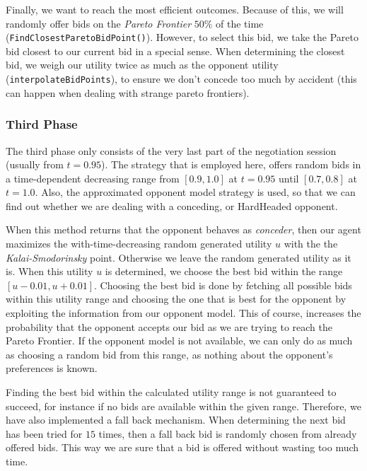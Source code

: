 Finally, we want to reach the most efficient outcomes. Because of this,
we will randomly offer bids on the \emph{Pareto Frontier} $50\%$ of the time (\verb-FindClosestParetoBidPoint()-).
However, to select this bid, we take the Pareto bid closest to our current bid in a special sense.
When determining the closest bid, we weigh our utility twice as much
as the opponent utility (\verb-interpolateBidPoints-), to ensure we don't concede too much by accident 
(this can happen when dealing with strange pareto frontiers).

\subsubsection{Third Phase}

The third phase only consists of the very last part of the negotiation session (usually from $t = 0.95$). The strategy that is employed here, offers random bids in a time-dependent decreasing range from $[0.9, 1.0]$ at $t = 0.95$ until $[0.7, 0.8]$ at $t = 1.0$. Also, the approximated opponent model strategy is used, so that we can find out whether we are dealing with a conceding, or HardHeaded opponent. 

When this method returns that the opponent behaves as \emph{conceder}, then our agent maximizes the with-time-decreasing random generated utility $u$ with the the \emph{Kalai-Smodorinsky} point. Otherwise we leave the random generated utility as it is. When this utility $u$ is determined, we choose the best bid within the range $[u-0.01, u+0.01]$. Choosing the best bid is done by fetching all possible bids within this utility range and choosing the one that is best for the opponent by exploiting the information from our opponent model. This of course, increases the probability that the opponent accepts our bid as we are trying to reach the Pareto Frontier. If the opponent model is not available, we can only do as much as choosing a random bid from this range, as nothing about the opponent's preferences is known.

Finding the best bid within the calculated utility range is not guaranteed to succeed, for instance if no bids are available within the given range. Therefore, we have also implemented a fall back mechanism. When determining the next bid has been tried for $15$ times, then a fall back bid is randomly chosen from already offered bids. This way we are sure that a bid is offered without wasting too much time.

